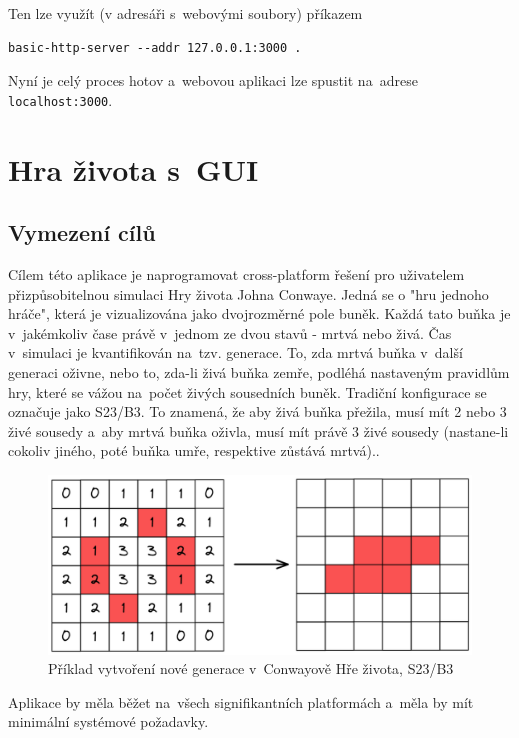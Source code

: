\documentclass[a4paper, 12pt, twoside]{article} %
\begin{document}
		Ten lze využít (v adresáři s~webovými soubory) příkazem
		\begin{verbatim}
basic-http-server --addr 127.0.0.1:3000 .
		\end{verbatim}
		
		Nyní je celý proces hotov a~webovou aplikaci lze spustit na~adrese \linebreak\texttt{localhost:3000}.\cite{wasm_vid, wasm_gh}


\section{Hra života s~GUI}
	\subsection{Vymezení cílů}
		Cílem této aplikace je naprogramovat cross-platform řešení pro uživatelem přizpůsobitelnou simulaci Hry života Johna Conwaye. Jedná se o "hru jednoho hráče", která je vizualizována jako dvojrozměrné pole buněk. Každá tato buňka je v~jakémkoliv čase právě v~jednom ze dvou stavů - mrtvá nebo živá. Čas v~simulaci je kvantifikován na~tzv. generace. To, zda mrtvá buňka v~další generaci oživne, nebo to, zda-li živá buňka zemře, podléhá nastaveným pravidlům hry, které se vážou na~počet živých sousedních buněk. Tradiční konfigurace se označuje jako S23/B3. To znamená, že aby živá buňka přežila, musí mít 2 nebo 3 živé sousedy a~aby mrtvá buňka oživla, musí mít právě 3 živé sousedy (nastane-li cokoliv jiného, poté buňka umře, respektive zůstává mrtvá).\cite{conway}.
		\begin{center}
			\begin{figure}[H]
				\centering
				\includegraphics[width=.82\linewidth]{conway}
				\caption{Příklad vytvoření nové generace v~Conwayově Hře života, S23/B3}
				\label{fig:conway}
			\end{figure}
		\end{center}
	
		Aplikace by měla běžet na~všech signifikantních platformách a~měla by mít minimální systémové požadavky.
	
\end{document}
